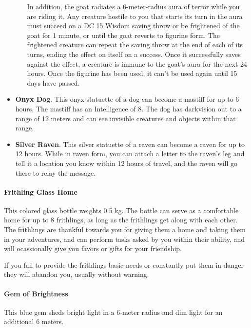 \begin{itemize}
\begin{itemize}
                In addition, the goat radiates a 6-meter-radius aura of terror while you are riding it.
                Any creature hostile to you that starts its turn in the aura must succeed on a DC 15 Wisdom saving throw or be frightened of the goat for 1 minute, or until the goat reverts to figurine form.
                The frightened creature can repeat the saving throw at the end of each of its turns, ending the effect on itself on a success. Once it successfully saves against the effect, a creature is immune to the goat's aura for the next 24 hours.
                Once the figurine has been used, it can't be used again until 15 days have passed.
            \end{itemize}
            \item \textbf{Onyx Dog}.
            This onyx statuette of a dog can become a mastiff for up to 6 hours.
            The mastiff has an Intelligence of 8.
            The dog has darkvision out to a range of 12 meters and can see invisible creatures and objects within that range.
            \item \textbf{Silver Raven}.
            This silver statuette of a raven can become a raven for up to 12 hours.
            While in raven form, you can attach a letter to the raven's leg and tell it a location you know within 12 hours of travel, and the raven will go there to relay the message.
        \end{itemize}
    \paragraph{Frithling Glass Home} \label{item::frithlingglasshome}
        This colored glass bottle weights 0.5 kg.
        The bottle can serve as a comfortable home for up to 8 frithlings, as long as the frithlings get along with each other.
        The frithlings are thankful towards you for giving them a home and taking them in your adventures, and can perform tasks asked by you within their ability, and will ocassionally give you favors or gifts for your friendship.

        If you fail to provide the frithlings basic needs or constantly put them in danger they will abandon you, usually without warning.
    \paragraph{Gem of Brightness}
        This blue gem sheds bright light in a 6-meter radius and dim light for an additional 6 meters.
